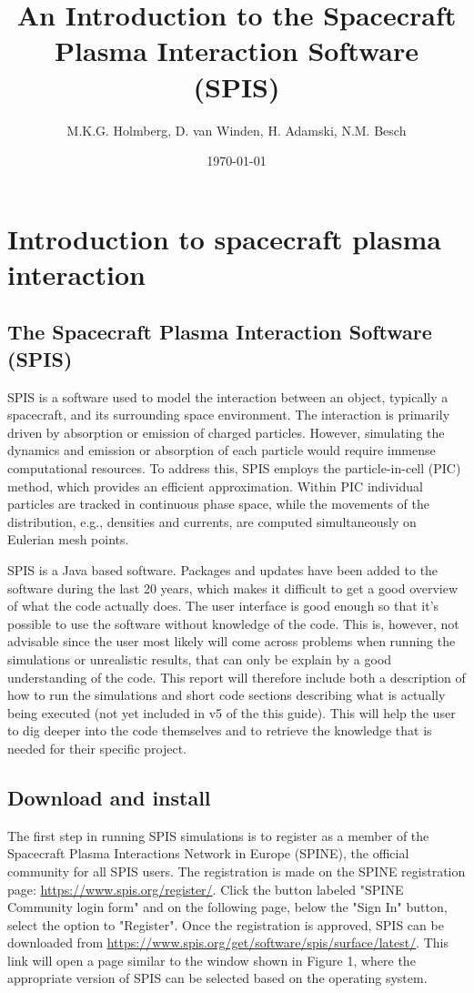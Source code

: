 \documentclass[a4paper, 11pt]{article}
\title{An Introduction to the Spacecraft Plasma Interaction Software (SPIS)}
\date{\today}
\author{M.K.G. Holmberg, D. van Winden, H. Adamski, N.M. Besch}
\begin{document}
\maketitle

\newpage
\tableofcontents
\newpage

\section{Introduction to spacecraft plasma interaction}

\subsection{The Spacecraft Plasma Interaction Software (SPIS)}

SPIS is a software used to model the interaction between an object, typically a spacecraft, and its surrounding space environment. The interaction is primarily driven by absorption or emission of charged particles. However, simulating the dynamics and emission or absorption of each particle would require immense computational resources. To address this, SPIS employs the particle-in-cell (PIC) method, which provides an efficient approximation. Within PIC individual particles are tracked in continuous phase space, while the movements of the distribution, e.g., densities and currents, are computed simultaneously on Eulerian mesh points.\par
SPIS is a Java based software. Packages and updates have been added to the software during the last 20 years, which makes it difficult to get a good overview of what the code actually does. The user interface is good enough so that it's possible to use the software without knowledge of the code. This is, however, not advisable since the user most likely will come across problems when running the simulations or unrealistic results, that can only be explain by a good understanding of the code. This report will therefore include both a description of how to run the simulations and short code sections describing what is actually being executed (not yet included in v5 of the this guide). This will help the user to dig deeper into the code themselves and to retrieve the knowledge that is needed for their specific project.

\subsection{Download and install}

The first step in running SPIS simulations is to register as a member of the  Spacecraft Plasma Interactions Network in Europe (SPINE), the official community for all SPIS users. The registration is made on the SPINE registration page: \url{https://www.spis.org/register/}. Click the button labeled "SPINE Community login form" and on the following page, below the "Sign In" button, select the option to "Register".  Once the registration is approved, SPIS can be downloaded from \url{https://www.spis.org/get/software/spis/surface/latest/}. This link will open a page similar to the window shown in Figure 1, where the appropriate version of SPIS can be selected based on the operating system.
\end{document}
